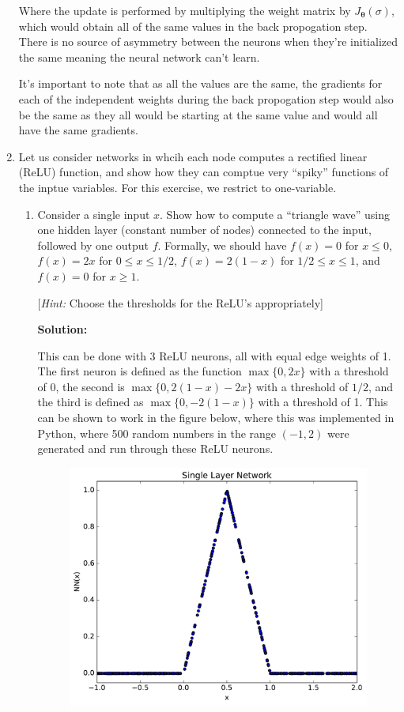 \documentclass[12pt]{article}
\begin{document}
\begin{enumerate}
Where the update is performed by multiplying the weight matrix by $J_{\bm{\theta}}(\sigma)$, which would obtain all of the same values in the back propogation step. There is no source of asymmetry between the neurons when they're initialized the same meaning the neural network can't learn.

It's important to note that as all the values are the same, the gradients for each of the independent weights during the back propogation step would also be the same as they all would be starting at the same value and would all have the same gradients.

\newpage

\item Let us consider networks in whcih each node computes a rectified linear (ReLU) function, and show how they can comptue very ``spiky'' functions of the inptue variables. For this exercise, we restrict to one-variable.

\begin{enumerate}
  \item Consider a single input $x$. Show how to compute a ``triangle wave'' using one hidden layer (constant number of nodes) connected to the input, followed by one output $f$. Formally, we should have $f(x) = 0$ for $x \leq 0$, $f(x) = 2x$ for $0 \leq x \leq 1/2$, $f(x) = 2(1-x)$ for $1/2 \leq x \leq 1$, and $f(x) = 0$ for $x \geq 1$. 

[{\em Hint:} Choose the thresholds for the ReLU's appropriately]

   {\bf Solution:}

This can be done with 3 ReLU neurons, all with equal edge weights of 1. The first neuron is defined as the function $\max\{0, 2x\}$ with a threshold of 0, the second is $\max\{0, 2(1-x) - 2x\}$ with a threshold of $1/2$, and the third is defined as $\max\{0, -2(1-x)\}$ with a threshold of 1. This can be shown to work in the figure below, where this was implemented in Python, where 500 random numbers in the range $(-1, 2)$ were generated and run through these ReLU neurons. 

\begin{figure}[H]
\centering
\includegraphics[width=.75\textwidth]{single_layer-13.pdf}
\end{figure}


\end{enumerate}
\end{enumerate}
\end{document}
